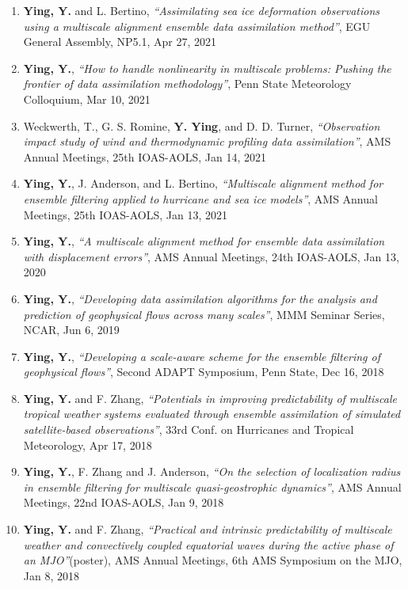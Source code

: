 \begin{enumerate}
\item \textbf{Ying, Y.} and L. Bertino,
\textit{``Assimilating sea ice deformation observations using a multiscale alignment ensemble data assimilation method''},
EGU General Assembly, NP5.1, Apr 27, 2021

\item \textbf{Ying, Y.},
\textit{``How to handle nonlinearity in multiscale problems: Pushing the frontier of data assimilation methodology''},
Penn State Meteorology Colloquium, Mar 10, 2021

\item Weckwerth, T., G. S. Romine, \textbf{Y. Ying}, and D. D. Turner,
\textit{``Observation impact study of wind and thermodynamic profiling data assimilation''},
AMS Annual Meetings, 25th IOAS-AOLS, Jan 14, 2021

\item \textbf{Ying, Y.}, J. Anderson, and L. Bertino,
\textit{``Multiscale alignment method for ensemble filtering applied to hurricane and sea ice models''},
AMS Annual Meetings, 25th IOAS-AOLS, Jan 13, 2021

\item \textbf{Ying, Y.},
\textit{``A multiscale alignment method for ensemble data assimilation with displacement errors''},
AMS Annual Meetings, 24th IOAS-AOLS, Jan 13, 2020

\item \textbf{Ying, Y.},
\textit{``Developing data assimilation algorithms for the analysis and prediction of geophysical flows across many scales''},
MMM Seminar Series, NCAR, Jun 6, 2019

\item \textbf{Ying, Y.},
\textit{``Developing a scale-aware scheme for the ensemble filtering of geophysical flows''},
Second ADAPT Symposium, Penn State, Dec 16, 2018

\item \textbf{Ying, Y.} and F. Zhang,
\textit{``Potentials in improving predictability of multiscale tropical weather systems evaluated through ensemble assimilation of simulated satellite-based observations''},
33rd Conf. on Hurricanes and Tropical Meteorology, Apr 17, 2018

\item \textbf{Ying, Y.}, F. Zhang and J. Anderson,
\textit{``On the selection of localization radius in ensemble filtering for multiscale quasi-geostrophic dynamics''},
AMS Annual Meetings, 22nd IOAS-AOLS, Jan 9, 2018

\item \textbf{Ying, Y.} and F. Zhang,
\textit{``Practical and intrinsic predictability of multiscale weather and convectively coupled equatorial waves during the active phase of an MJO''}(poster),
AMS Annual Meetings, 6th AMS Symposium on the MJO, Jan 8, 2018


\end{enumerate}
